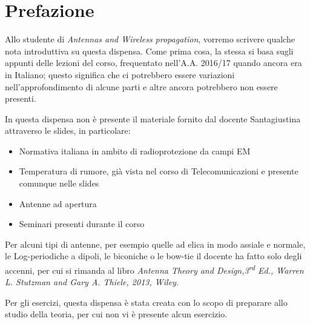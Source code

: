 \chapter{Prefazione}
Allo studente di \emph{Antennas and Wireless propagation}, vorremo scrivere qualche nota introduttiva su questa dispensa. Come prima cosa, la stessa si basa sugli appunti delle lezioni del corso, frequentato nell'A.A. 2016/17 quando ancora era in Italiano; questo significa che ci potrebbero essere variazioni nell'approfondimento di alcune parti e altre ancora potrebbero non essere presenti.


In questa dispensa non è presente il materiale fornito dal docente Santagiustina attraverso le slides, in particolare:
\begin{itemize}
  \item Normativa italiana in ambito di radioprotezione da campi EM
  \item Temperatura di rumore, già vista nel corso di Telecomunicazioni e presente comunque nelle slides
  \item Antenne ad apertura
  \item Seminari presenti durante il corso
\end{itemize}


Per alcuni tipi di antenne, per esempio quelle ad elica in modo assiale e normale, le Log-periodiche a dipoli, le biconiche o le bow-tie il docente ha fatto solo degli accenni, per cui si rimanda al libro \emph{Antenna Theory and Design,3\textsuperscript{rd} Ed., Warren L. Stutzman  and Gary A. Thiele, 2013, Wiley}.


Per gli esercizi, questa dispensa è stata creata con lo scopo di preparare allo studio della teoria, per cui non vi è presente alcun esercizio.
